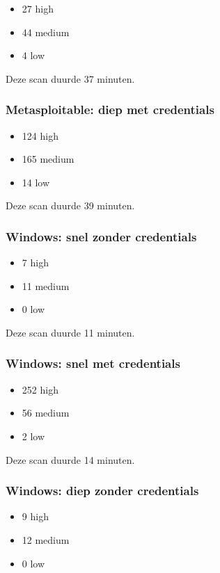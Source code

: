 \begin{itemize}
\item 27 high
\item 44 medium
\item 4 low
\end{itemize}

Deze scan duurde 37 minuten.

\subsubsection{Metasploitable: diep met credentials}

\begin{itemize}
\item 124 high
\item 165 medium
\item 14 low
\end{itemize}

Deze scan duurde 39 minuten.

\subsubsection{Windows: snel zonder credentials}

\begin{itemize}
\item 7 high
\item 11 medium
\item 0 low
\end{itemize}

Deze scan duurde 11 minuten.

\subsubsection{Windows: snel met credentials}

\begin{itemize}
\item 252 high
\item 56 medium
\item 2 low
\end{itemize}

Deze scan duurde 14 minuten.

\subsubsection{Windows: diep zonder credentials}

\begin{itemize}
\item 9 high
\item 12 medium
\item 0 low
\end{itemize}

